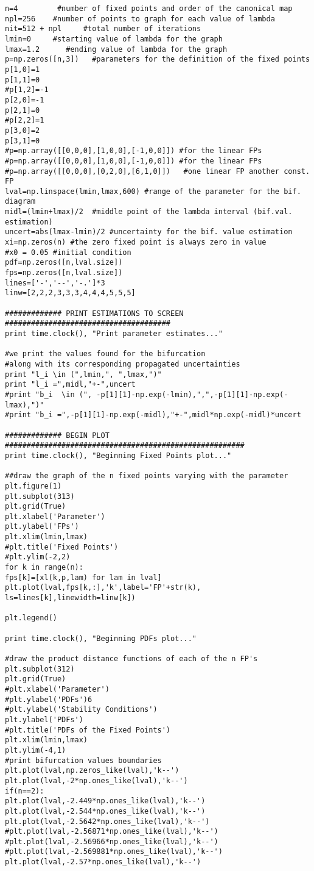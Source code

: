 \documentclass[10pt,twoside,titlepage]{book}
\numberwithin{equation}{chapter}
\numberwithin{figure}{chapter}
\numberwithin{table}{chapter}
\theoremstyle{plain}%
\theoremstyle{definition}
\theoremstyle{remark}
\begin{document}
\begin{verbatim}
n=4         #number of fixed points and order of the canonical map
npl=256    #number of points to graph for each value of lambda
nit=512 + npl     #total number of iterations
lmin=0     #starting value of lambda for the graph
lmax=1.2      #ending value of lambda for the graph
p=np.zeros([n,3])   #parameters for the definition of the fixed points
p[1,0]=1
p[1,1]=0
#p[1,2]=-1
p[2,0]=-1
p[2,1]=0
#p[2,2]=1
p[3,0]=2
p[3,1]=0
#p=np.array([[0,0,0],[1,0,0],[-1,0,0]]) #for the linear FPs
#p=np.array([[0,0,0],[1,0,0],[-1,0,0]]) #for the linear FPs
#p=np.array([[0,0,0],[0,2,0],[6,1,0]])   #one linear FP another const. FP
lval=np.linspace(lmin,lmax,600) #range of the parameter for the bif. diagram
midl=(lmin+lmax)/2  #middle point of the lambda interval (bif.val. estimation)
uncert=abs(lmax-lmin)/2 #uncertainty for the bif. value estimation
xi=np.zeros(n) #the zero fixed point is always zero in value
#x0 = 0.05 #initial condition
pdf=np.zeros([n,lval.size])
fps=np.zeros([n,lval.size])
lines=['-','--','-.']*3
linw=[2,2,2,3,3,3,4,4,4,5,5,5]

############# PRINT ESTIMATIONS TO SCREEN ######################################
print time.clock(), "Print parameter estimates..."

#we print the values found for the bifurcation
#along with its corresponding propagated uncertainties
print "l_i \in (",lmin,", ",lmax,")"
print "l_i =",midl,"+-",uncert
#print "b_i  \in (", -p[1][1]-np.exp(-lmin),",",-p[1][1]-np.exp(-lmax),")"
#print "b_i =",-p[1][1]-np.exp(-midl),"+-",midl*np.exp(-midl)*uncert

############# BEGIN PLOT #######################################################
print time.clock(), "Beginning Fixed Points plot..."

##draw the graph of the n fixed points varying with the parameter
plt.figure(1)
plt.subplot(313)
plt.grid(True)
plt.xlabel('Parameter')
plt.ylabel('FPs')
plt.xlim(lmin,lmax)
#plt.title('Fixed Points')
#plt.ylim(-2,2)
for k in range(n):
fps[k]=[xl(k,p,lam) for lam in lval]
plt.plot(lval,fps[k,:],'k',label='FP'+str(k), ls=lines[k],linewidth=linw[k])

plt.legend()

print time.clock(), "Beginning PDFs plot..."

#draw the product distance functions of each of the n FP's
plt.subplot(312)
plt.grid(True)
#plt.xlabel('Parameter')
#plt.ylabel('PDFs')6
#plt.ylabel('Stability Conditions')
plt.ylabel('PDFs')
#plt.title('PDFs of the Fixed Points')
plt.xlim(lmin,lmax)
plt.ylim(-4,1)
#print bifurcation values boundaries
plt.plot(lval,np.zeros_like(lval),'k--')
plt.plot(lval,-2*np.ones_like(lval),'k--')
if(n==2):
plt.plot(lval,-2.449*np.ones_like(lval),'k--')
plt.plot(lval,-2.544*np.ones_like(lval),'k--')
plt.plot(lval,-2.5642*np.ones_like(lval),'k--')
#plt.plot(lval,-2.56871*np.ones_like(lval),'k--')
#plt.plot(lval,-2.56966*np.ones_like(lval),'k--')
#plt.plot(lval,-2.569881*np.ones_like(lval),'k--')
plt.plot(lval,-2.57*np.ones_like(lval),'k--')


\end{verbatim}
\end{document}
